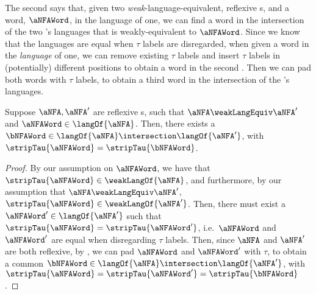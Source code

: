 The second says that, given two \emph{weak}-language-equivalent, reflexive
\TNFA{}s, and a word, $\aNFAWord$, in the language of one, we can find a word
in the intersection of the two \TNFA{}'s languages that is weakly-equivalent to
$\aNFAWord$. Since we know that the languages are equal when $\tau$ labels are
disregarded, when given a word in the \emph{language} of one, we can remove
existing $\tau$ labels and insert $\tau$ labels in (potentially) different
positions to obtain a word in the second \TNFA{}. Then we can pad both words
with $\tau$ labels, to obtain a third word in the intersection of the \TNFA{}'s
languages.

\begin{lemma} \label{lem:wordInIntersectionOfWeakEquivTNFAs}
    Suppose $\aNFA, \aNFA'$ are reflexive \TNFA{}s, such that $\aNFA
    \weakLangEquiv \aNFA'$ and $\aNFAWord \in \langOf{\aNFA}$. Then, there
    exists a $\bNFAWord \in \langOf{\aNFA} \intersection \langOf{\aNFA'}$, with
    $\stripTau{\aNFAWord} = \stripTau{\bNFAWord}$.
\end{lemma}
\begin{proof}
    By our assumption on $\aNFAWord$, we have that  $\stripTau{\aNFAWord} \in
    \weakLangOf{\aNFA}$, and furthermore, by our assumption that $\aNFA
    \weakLangEquiv \aNFA'$, $\stripTau{\aNFAWord} \in \weakLangOf{\aNFA'}$.
    Then, there must exist a $\aNFAWord' \in \langOf{\aNFA'}$ such that
    $\stripTau{\aNFAWord} = \stripTau{\aNFAWord'}$, i.e.\ $\aNFAWord$ and
    $\aNFAWord'$ are equal when disregarding $\tau$ labels.
    Then, since $\aNFA$ and $\aNFA'$ are both reflexive, by
    , we can pad $\aNFAWord$ and $\aNFAWord'$ with
    $\tau$, to obtain a common $\bNFAWord \in \langOf{\aNFA} \intersection
    \langOf{\aNFA'}$, with $\stripTau{\aNFAWord} = \stripTau{\aNFAWord'} =
    \stripTau{\bNFAWord}$.
\end{proof}


